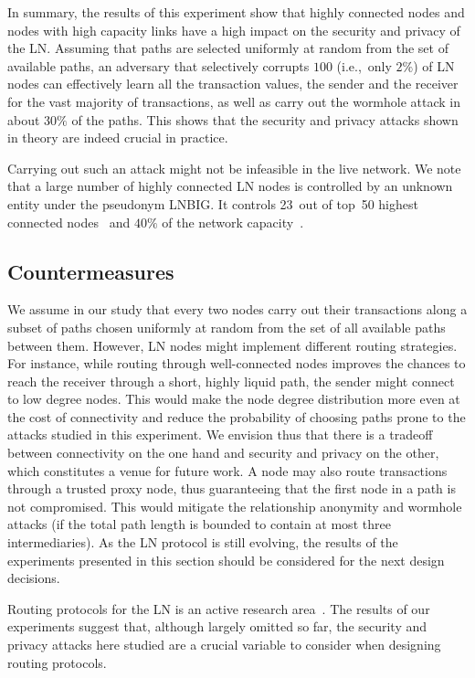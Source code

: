 In summary, 
the results of this experiment show that highly connected nodes and nodes with high capacity links have a high impact on the security and privacy of the LN.
Assuming that paths are selected uniformly at random from the set of available paths, 
an adversary that selectively corrupts $100$ (i.e.,~only $2\%$) 
of LN nodes can effectively learn all the transaction values, 
the sender and the receiver for the vast majority of transactions, 
as well as carry out the wormhole attack in about $30\%$ of the paths. 
This shows that the security and privacy attacks shown in theory are indeed crucial in practice. 

Carrying out such an attack might not be infeasible in the live network. We 
note that a large number of highly connected LN nodes is controlled by an unknown entity under the pseudonym LNBIG.
It controls 23~out of top~50 highest connected nodes~\cite{1MLTopConnected} and $40\%$ of the network capacity~\cite{TheBlockLNBIG}.

\subsection{Countermeasures}
We assume in our study that every two nodes carry out their transactions  
along a subset of paths chosen uniformly at random from the set of all available paths between them. 
However, LN nodes might implement different routing strategies. 
For instance, while routing through well-connected nodes improves the chances to reach the receiver through a short, highly liquid path, 
the sender might connect to low degree nodes.
This would make the node degree distribution more even at the cost of connectivity and reduce the probability of choosing paths prone to the 
attacks studied in this experiment. 
We envision thus that there is a tradeoff between connectivity on the one hand and security and privacy on the other,
which constitutes a venue for future work.
A node may also route transactions through a trusted proxy node, 
thus guaranteeing that the first node in a path is not compromised.
This would mitigate the relationship anonymity and wormhole attacks (if the total path length is bounded to contain at most three intermediaries).
As the LN protocol is still evolving, the results of the experiments presented in this section should be considered 
for the next design decisions.

Routing protocols for the LN is an active research area~\cite{Roos2018, Sivaraman2018, Malavolta2017a, Prihodko2016, Grunspan2018, Bagaria2019, Osuntokun2018, Pickhardt2019, ZmnSCPxj2019, ZmnSCPxj2019a, ZmnSCPxj2019b}.
The results of our experiments suggest that, although largely omitted so far, 
the security and privacy attacks here studied are a crucial variable to consider when designing routing protocols. 
